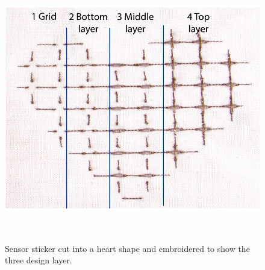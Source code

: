 \documentclass[header.tex]{subfiles}
\begin{document}
\begin{figure}
\centering
  \includegraphics[width=0.7\columnwidth]{figures/heart}
  \caption{Sensor sticker cut into a heart shape and embroidered to show the three design layer.}~\label{fig:Sensor}
  \vspace{-2.5em}
  \end{figure}
  

\end{document}
